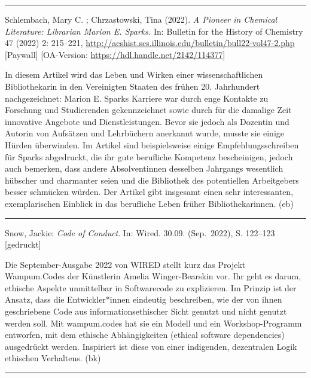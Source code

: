 \documentclass[a4paper,
fontsize=11pt,
oneside,
numbers=noperiodatend,
parskip=half-,
bibliography=totoc,
final
]{scrartcl}
\begin{document}
\begin{center}\rule{0.5\linewidth}{0.5pt}\end{center}

\pagebreak
Schlembach, Mary C. ; Chrzastowski, Tina (2022). \emph{A Pioneer in
Chemical Literature: Librarian Marion E. Sparks.} In: Bulletin for the
History of Chemistry 47 (2022) 2: 215--221,
\url{http://acshist.scs.illinois.edu/bulletin/bull22-vol47-2.php}
{[}Paywall{]} {[}OA-Version: \url{https://hdl.handle.net/2142/114377}{]}

In diesem Artikel wird das Leben und Wirken einer wissenschaftlichen
Bibliothekarin in den Vereinigten Staaten des frühen 20. Jahrhundert
nachgezeichnet: Marion E. Sparks Karriere war durch enge Kontakte zu
Forschung und Studierenden gekennzeichnet sowie durch für die damalige
Zeit innovative Angebote und Dienstleistungen. Bevor sie jedoch als
Dozentin und Autorin von Aufsätzen und Lehrbüchern anerkannt wurde,
musste sie einige Hürden überwinden. Im Artikel sind beispielsweise
einige Empfehlungsschreiben für Sparks abgedruckt, die ihr gute
berufliche Kompetenz bescheinigen, jedoch auch bemerken, dass andere
Absolventinnen desselben Jahrgangs wesentlich hübscher und charmanter
seien und die Bibliothek des potentiellen Arbeitgebers besser schmücken
würden. Der Artikel gibt insgesamt einen sehr interessanten,
exemplarischen Einblick in das berufliche Leben früher
Bibliothekarinnen. (eb)

\begin{center}\rule{0.5\linewidth}{0.5pt}\end{center}

Snow, Jackie: \emph{Code of Conduct}. In: Wired. 30.09. (Sep.~2022), S.
122--123 {[}gedruckt{]}

Die September-Ausgabe 2022 von WIRED stellt kurz das Projekt
Wampum.Codes der Künstlerin Amelia Winger-Bearskin vor. Ihr geht es
darum, ethische Aspekte unmittelbar in Softwarecode zu explizieren. Im
Prinzip ist der Ansatz, dass die Entwickler*innen eindeutig beschreiben,
wie der von ihnen geschriebene Code aus informationsethischer Sicht
genutzt und nicht genutzt werden soll. Mit wampum.codes hat sie ein
Modell und ein Workshop-Programm entworfen, mit dem ethische
Abhängigkeiten (ethical software dependencies) ausgedrückt werden.
Inspiriert ist diese von einer indigenden, dezentralen Logik ethischen
Verhaltens. (bk)

\begin{center}\rule{0.5\linewidth}{0.5pt}\end{center}
\end{document}
